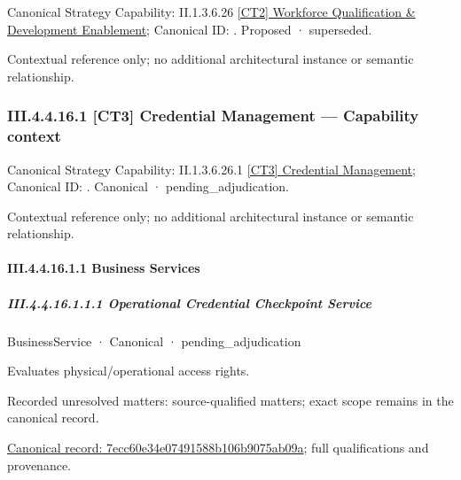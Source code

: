 {\small Canonical Strategy Capability: II.1.3.6.26 \hyperref[element:d24a1f4c4f674c45a95c317998ff4186]{[CT2] Workforce Qualification \& Development Enablement}; Canonical ID: \texttt{}. Proposed · superseded.}\par
Contextual reference only; no additional architectural instance or semantic relationship.\par
\subsubsection*{III.4.4.16.1 [CT3] Credential Management — Capability context}
\label{navigation:III.4.4.16.1}

{\small Canonical Strategy Capability: II.1.3.6.26.1 \hyperref[element:3a7a4d2d0ce8446b8a6293284fb16b83]{[CT3] Credential Management}; Canonical ID: \texttt{}. Canonical · pending\_adjudication.}\par
Contextual reference only; no additional architectural instance or semantic relationship.\par
\paragraph*{III.4.4.16.1.1 Business Services}
\label{navigation:III.4.4.16.1.1}

\subparagraph*{III.4.4.16.1.1.1 Operational Credential Checkpoint Service}
\label{navigation:III.4.4.16.1.1.1}

\label{element:7ecc60e34e07491588b106b9075ab09a}
{\small BusinessService · Canonical · pending\_adjudication}\par

Evaluates physical/operational access rights.


{\small Recorded unresolved matters: source-qualified matters; exact scope remains in the canonical record.}\par
{\footnotesize \href{../../../../../../../continuum/business/business-service/7ecc60e34e07491588b106b9075ab09a.md}{Canonical record: 7ecc60e34e07491588b106b9075ab09a}; full qualifications and provenance.}\par
